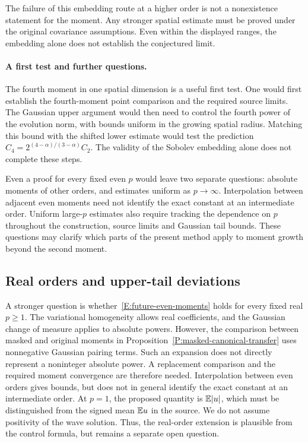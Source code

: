 The failure of this embedding route at a higher order is not a nonexistence
statement for the moment. Any stronger spatial estimate must be proved under
the original covariance assumptions. Even within the displayed ranges,
the embedding alone does not establish the conjectured limit.

\paragraph{A first test and further questions.}
The fourth moment in one spatial dimension is a useful first test. One would
first establish the fourth-moment point comparison and the required source
limits. The Gaussian upper argument would then need to control the fourth
power of the evolution norm, with bounds uniform in the growing spatial
radius. Matching this bound with the shifted lower estimate would test the
prediction $C_4 = 2^{(4-\alpha)/(3-\alpha)}C_2$. The validity of the Sobolev
embedding alone does not complete these steps.

Even a proof for every fixed even $p$ would leave two separate questions:
absolute moments of other orders, and estimates uniform as $p\to\infty$.
Interpolation between adjacent even moments need not identify the exact
constant at an intermediate order. Uniform large-$p$ estimates also require
tracking the dependence on $p$ throughout the construction, source limits and
Gaussian tail bounds. These questions may clarify which parts of the present
method apply to moment growth beyond the second moment.

\subsection{Real orders and upper-tail deviations}\label{S:future-real-orders}
A stronger question is whether~\eqref{E:future-even-moments} holds for every
fixed real $p \ge 1$. The variational homogeneity allows real coefficients,
and the Gaussian change of measure applies to absolute powers. However, the
comparison between masked and original moments in
Proposition~\ref{P:masked-canonical-transfer} uses nonnegative Gaussian pairing
terms. Such an expansion does not directly represent a noninteger absolute
power. A replacement comparison and the required moment convergence are
therefore needed. Interpolation between even orders gives bounds, but does
not in general identify the exact constant at an intermediate order. At
$p = 1$, the proposed quantity is $\mathbb{E}|u|$, which must be distinguished from
the signed mean $\mathbb{E} u$ in the source. We do not assume positivity of the wave
solution. Thus, the real-order extension is plausible from the control
formula, but remains a separate open question.


